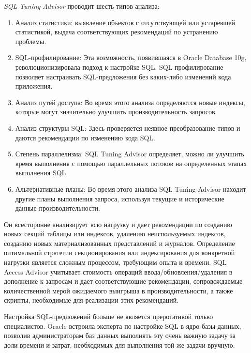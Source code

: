\textit{SQL Tuning Advisor} проводит шесть типов анализа:

\begin{enumerate}
\item Анализ статистики: выявление объектов с отсутствующей или устаревшей статистикой, выдача соответствующих рекомендаций по устранению проблемы.
\item SQL-профилирование: Эта возможность, появившаяся в Oracle Database 10g, революционизировала подход к настройке SQL. SQL-профилирование позволяет настраивать SQL-предложения без каких-либо изменений кода приложения.
\item Анализ путей доступа: Во время этого анализа определяются новые индексы, которые могут значительно улучшить производительность запросов.
\item Анализ структуры SQL: Здесь проверяется неявное преобразование типов и даются рекомендации по изменению кода SQL.
\item Степень параллелизма: SQL Tuning Advisor определяет, можно ли улучшить время выполнения с помощью параллельных потоков на определенных этапах выполнения SQL.
\item Альтернативные планы: Во время этого анализа SQL Tuning Advisor находит другие планы выполнения запроса, используя текущие и исторические данные производительности.
\end{enumerate}

Он всесторонне анализирует всю нагрузку и дает рекомендации по созданию новых секций таблицы или индексов, удалению неиспользуемых индексов, созданию новых материализованных представлений и журналов. Определение оптимальной стратегии секционирования или индексирования для конкретной нагрузки является сложным процессом, требующим опыта и времени. SQL Access Advisor учитывает стоимость операций ввода/обновления/удаления в дополнение к запросам и дает соответствующие рекомендации, сопровождаемые количественной мерой ожидаемого выигрыша в производительности, а также скрипты, необходимые для реализации этих рекомендаций. 

Настройка SQL-предложений больше не является прерогативой только специалистов. Oracle встроила эксперта по настройке SQL в ядро базы данных, позволив администраторам баз данных выполнять эту очень важную задачу за доли времени и затрат, необходимых для выполнения той же задачи вручную.

\cite{fors.ru:Oracle-Database}